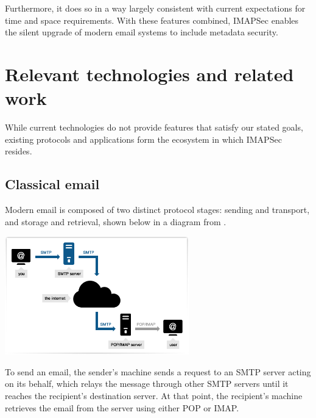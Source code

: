 \documentclass[pageno]{jpaper}
\newcommand{\project}{IMAPSec }
\begin{document}
Furthermore, it does so in a way largely consistent with current expectations for time and space requirements. With these features combined, \project enables the silent upgrade of modern email systems to include metadata security.


\section{Relevant technologies and related work}

While current technologies do not provide features that satisfy our stated goals, existing protocols and applications form the ecosystem in which \project resides.

\subsection{Classical email}
Modern email is composed of two distinct protocol stages: sending and transport, and storage and retrieval, shown below in a diagram from \cite{smtp_imap}.

\begin{center}
\includegraphics[width=0.6\textwidth]{smtp_imap}
\end{center}

To send an email, the sender's machine sends a request to an SMTP server acting on its behalf, which relays the message through other SMTP servers until it reaches the recipient's destination server. At that point, the recipient's machine retrieves the email from the server using either POP or IMAP.
\end{document}

